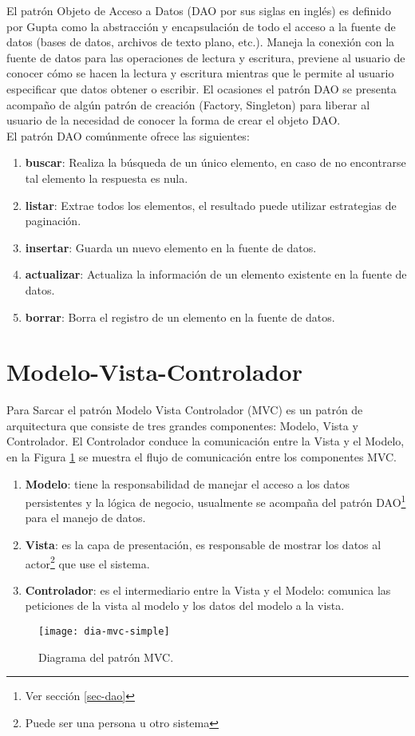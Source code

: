 El patrón Objeto de Acceso a Datos (DAO por sus siglas en inglés) es definido por Gupta\cite{OCPJavaSE7} como la abstracción y encapsulación de todo el acceso a la fuente de datos (bases de datos, archivos de texto plano, etc.). Maneja la conexión con la fuente de datos para las operaciones de lectura y escritura, previene al usuario de conocer cómo se hacen la lectura y escritura mientras que le permite al usuario especificar que datos obtener o escribir.
El ocasiones el patrón DAO se presenta acompaño de algún patrón de creación (Factory, Singleton) para liberar al usuario de la necesidad de conocer la forma de crear el objeto DAO\cite{OCPJavaSE7}\cite{OCAPJavaSE7}.\\
El patrón DAO comúnmente ofrece las siguientes:
\begin{enumerate}
	\item [] \textbf{buscar}: Realiza la búsqueda de un único elemento, en caso de no encontrarse tal elemento la respuesta es nula.
	\item [] \textbf{listar}: Extrae todos los elementos, el resultado puede utilizar estrategias de paginación.
	\item [] \textbf{insertar}: Guarda un nuevo elemento en la fuente de datos.
	\item [] \textbf{actualizar}: Actualiza la información de un elemento existente en la fuente de datos.
	\item [] \textbf{borrar}: Borra el registro de un elemento en la fuente de datos.
\end{enumerate}


\section{Modelo-Vista-Controlador}\label{sec-mvc}
Para Sarcar\cite{JavaDesignPatternsExamples} el patrón Modelo Vista Controlador (MVC) es un patrón de arquitectura que consiste de tres grandes componentes: Modelo, Vista y Controlador. El Controlador conduce la comunicación entre la Vista y el Modelo, en la Figura \ref{fig:dia-mvc-simple} se muestra el flujo de comunicación entre los componentes MVC.
\begin{enumerate}
	\item \textbf{Modelo}: tiene la responsabilidad de manejar el acceso a los datos persistentes y la lógica de negocio, usualmente se acompaña del patrón DAO\footnote{Ver sección \ref{sec-dao}} para el manejo de datos.
	\item \textbf{Vista}: es la capa de presentación, es responsable de mostrar los datos al actor\footnote{Puede ser una persona u otro sistema} que use el sistema.
	\item \textbf{Controlador}: es el intermediario entre la Vista y el Modelo: comunica las peticiones de la vista al modelo y los datos del modelo a la vista.
\end{enumerate}
\begin{figure}[h]
  \centering
  \texttt{[image: dia-mvc-simple]}
  \caption{Diagrama del patrón MVC.}
  \label{fig:dia-mvc-simple}
\end{figure}
